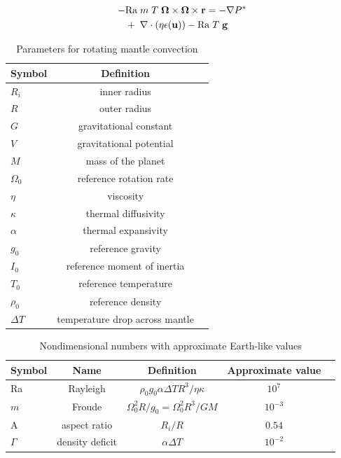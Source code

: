 \documentclass[extra,mreferee]{gji}
\begin{document}
\begin{equation}
\begin{aligned}
 - & \mathrm{Ra} \; m \; T \; \mitbf{\Omega} \times \mitbf{\Omega} \times \mathbf{r} = - \nabla P^* \\ 
&+ \; \nabla \cdot \left( \eta \epsilon (\mathbf{u}) \right) - \mathrm{Ra} \; T \; \mathbf{g}
\end{aligned}
\end{equation}

  
\fi

\begin{table}
\centering
\caption{Parameters for rotating mantle convection}
\label{tab:parameters}
\begin{tabular}{@{}lcc}
Symbol & Definition\\
\hline
$R_i$ & inner radius \\
$R$ & outer radius \\
$G$ & gravitational constant \\
$V$ & gravitational potential \\
$M$ & mass of the planet \\
$\Omega_0$ & reference rotation rate \\
$\eta$ & viscosity \\
$\kappa$ & thermal diffusivity \\
$\alpha$ &  thermal expansivity \\ 
$g_0$ & reference gravity \\
$I_0$ & reference moment of inertia \\
$T_0$ & reference temperature \\
$\rho_0$ & reference density \\ 
$\Delta T$ & temperature drop across mantle
\end{tabular}
\end{table}

\begin{table}
\centering
\caption{Nondimensional numbers with approximate Earth-like values}
\label{tab:nondim}
\begin{tabular}{@{}lcccc}
Symbol &  Name & Definition & Approximate value \\
\hline
Ra & Rayleigh &  $\rho_0 g_0 \alpha \Delta T R^3/\eta \kappa$ & $10^7$\\
$m$ & Froude & $\Omega_0^2 R/g_0 = \Omega_0^2 R^3/GM$ & $10^{-3}$ \\
A & aspect ratio & $R_i/R$ & $0.54$ \\
$\Gamma$ & density deficit &$ \alpha \Delta T$ & $10^{-2}$ \\
\end{tabular}
\end{table}
 
\end{document}
